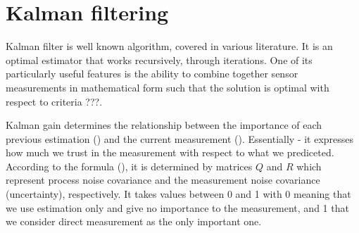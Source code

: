 \chapter{Kalman filtering} \label{chap:kalman}

Kalman filter is well known algorithm, covered in various literature. It is an optimal estimator that works recursively, through iterations. One of its particularly useful features is the ability to combine together sensor measurements in mathematical form such that the solution is optimal with respect to criteria ???.

Kalman gain determines the relationship between the importance of each previous estimation () and the current measurement (). Essentially - it expresses how much we trust in the measurement with respect to what we prediceted. According to the formula (), it is determined by matrices $Q$ and $R$ which represent process noise covariance and the measurement noise covariance (uncertainty), respectively. It takes values between 0 and 1 with 0 meaning that we use estimation only and give no importance to the measurement, and 1 that we consider direct measurement as the only important one.   
